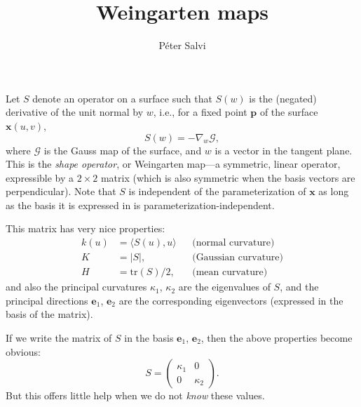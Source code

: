 \documentclass[a4paper]{article}
\begin{document}
\title{Weingarten maps}
\author{P\'eter Salvi}
\maketitle

Let $S$ denote an operator on a surface such that $S(w)$ is the
(negated) derivative of the unit normal by $w$, i.e., for a fixed
point $\mathbf{p}$ of the surface $\mathbf{x}(u,v)$,
\[S(w)=-\nabla_w\mathcal{G},\]
where $\mathcal{G}$ is the Gauss map of the surface, and $w$ is a
vector in the tangent plane. This is the \emph{shape operator}, or
Weingarten map---a symmetric, linear operator, expressible by a
$2\times2$ matrix (which is also symmetric when the basis vectors are
perpendicular). Note that $S$ is independent of the parameterization
of $\mathbf{x}$ as long as the basis it is expressed in is
parameterization-independent.

This matrix has very nice properties:
\begin{align*}
  k(u)&=\langle S(u),u\rangle&&\text{(normal curvature)}\\
  K&=|S|,&&\text{(Gaussian curvature)}\\
  H&=\mathrm{tr}(S)/2,&&\text{(mean curvature)}
\end{align*}
and also the principal curvatures $\kappa_1$, $\kappa_2$ are the
eigenvalues of $S$, and the principal directions $\mathbf{e}_1$,
$\mathbf{e}_2$ are the corresponding eigenvectors (expressed in the
basis of the matrix).

If we write the matrix of $S$ in the basis $\mathbf{e}_1$,
$\mathbf{e}_2$, then the above properties become obvious:
\begin{equation}
  S=
  \begin{pmatrix}
    \kappa_1 & 0 \\
    0 & \kappa_2
  \end{pmatrix}.
  \label{eq:S}
\end{equation}
But this offers little help when we do not \emph{know} these values.
\end{document}
